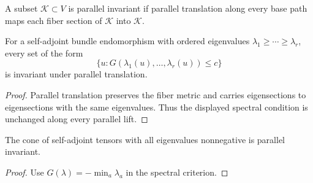 \begin{definition}
\label{def:chow-ii-parallel-invariant-set}
A subset $\mathcal K\subset V$ is parallel invariant if parallel translation along
every base path maps each fiber section of $\mathcal K$ into $\mathcal K$.
\end{definition}

\begin{lemma}
\label{lem:chow-ii-spectral-invariance}
For a self-adjoint bundle endomorphism with ordered eigenvalues
$\lambda_1\ge\cdots\ge\lambda_r$, every set of the form
\[
\{u:G(\lambda_1(u),\ldots,\lambda_r(u))\le c\}
\]
is invariant under parallel translation.
\end{lemma}
\begin{proof}
\sketch
Parallel translation preserves the fiber metric and carries eigensections to
eigensections with the same eigenvalues.  Thus the displayed spectral condition
is unchanged along every parallel lift.
\end{proof}

\begin{corollary}
\label{cor:chow-ii-nonnegative-tensor-cone}
The cone of self-adjoint tensors with all eigenvalues nonnegative is parallel
invariant.
\end{corollary}
\begin{proof}
\sketch
{}
Use $G(\lambda)=-\min_a\lambda_a$ in the spectral criterion.
\end{proof}

